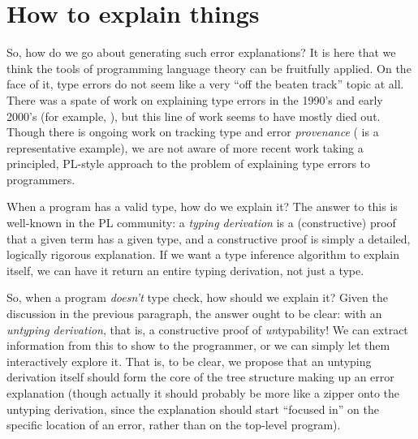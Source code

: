 \documentclass[sigplan, screen]{acmart}\settopmatter{printccs=false,printacmref=false}
\begin{document}
\section{How to explain things}

So, how do we go about generating such error explanations?  It is here
that we think the tools of programming language theory can be
fruitfully applied. On the face of it, type errors do not seem like a
very ``off the beaten track'' topic at all. There was a
spate of work on explaining type errors in the 1990's and early 2000's
(for example, \citet{beaven1993explaining, chitil:compositional, simon:typeview}), but
this line of work seems to have mostly died out. Though there is
ongoing work on tracking type and error \emph{provenance}
(\citet{augustsson-provenance} is a representative example), we are not
aware of more recent work taking a principled, PL-style approach to
the problem of explaining type errors to programmers.

When a program has a valid type, how do we explain it?  The answer to
this is well-known in the PL community: a \emph{typing derivation} is
a (constructive) proof that a given term has a given type, and a
constructive proof is simply a detailed, logically
rigorous explanation.  If we want a type inference algorithm to
explain itself, we can have it return an entire typing derivation, not
just a type.

So, when a program \emph{doesn't} type check, how should we explain
it?  Given the discussion in the previous paragraph, the answer ought
to be clear: with an \emph{untyping derivation}, that is, a
constructive proof of \emph{un}typability!  We can extract information
from this to show to the programmer, or we can simply let them
interactively explore it.  That is, to be clear, we propose that an
untyping derivation itself should form the core of the tree structure
making up an error explanation (though actually it should probably be
more like a zipper onto the untyping derivation, since the explanation
should start ``focused in'' on the specific location of an error,
rather than on the top-level program).
\end{document}
